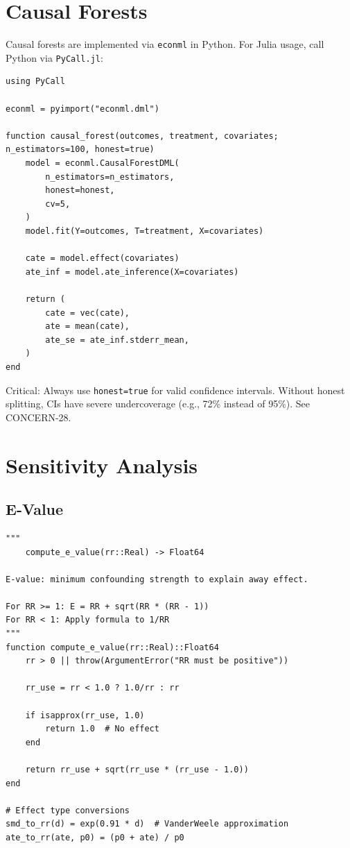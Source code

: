 \section{Causal Forests}
\label{sec:julia_forests}

Causal forests are implemented via \texttt{econml} in Python. For Julia usage, call Python via \texttt{PyCall.jl}:

\begin{verbatim}
using PyCall

econml = pyimport("econml.dml")

function causal_forest(outcomes, treatment, covariates; n_estimators=100, honest=true)
    model = econml.CausalForestDML(
        n_estimators=n_estimators,
        honest=honest,
        cv=5,
    )
    model.fit(Y=outcomes, T=treatment, X=covariates)

    cate = model.effect(covariates)
    ate_inf = model.ate_inference(X=covariates)

    return (
        cate = vec(cate),
        ate = mean(cate),
        ate_se = ate_inf.stderr_mean,
    )
end
\end{verbatim}

\begin{insight}
Critical: Always use \texttt{honest=true} for valid confidence intervals. Without honest splitting, CIs have severe undercoverage (e.g., 72\% instead of 95\%). See CONCERN-28.
\end{insight}

\section{Sensitivity Analysis}
\label{sec:julia_sensitivity}

\subsection{E-Value}

\begin{verbatim}
"""
    compute_e_value(rr::Real) -> Float64

E-value: minimum confounding strength to explain away effect.

For RR >= 1: E = RR + sqrt(RR * (RR - 1))
For RR < 1: Apply formula to 1/RR
"""
function compute_e_value(rr::Real)::Float64
    rr > 0 || throw(ArgumentError("RR must be positive"))

    rr_use = rr < 1.0 ? 1.0/rr : rr

    if isapprox(rr_use, 1.0)
        return 1.0  # No effect
    end

    return rr_use + sqrt(rr_use * (rr_use - 1.0))
end

# Effect type conversions
smd_to_rr(d) = exp(0.91 * d)  # VanderWeele approximation
ate_to_rr(ate, p0) = (p0 + ate) / p0
\end{verbatim}

